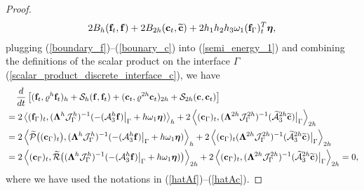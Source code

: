 \begin{proof}
\begin{multline}
2B_{h}({\bf f}_t,{\bf f}) + 2B_{2h}({\bf c}_t,\widetilde{\bf c}) + 2h_1h_2h_3\omega_1({\bf f}_\Gamma)_t^T{\bm \eta},
\end{multline}
plugging (\ref{boundary_f})--(\ref{bounary_c}) into (\ref{semi_energy_1}) and combining the definitions of the scalar product on the interface $\Gamma$ (\ref{scalar_product_discrete_interface_c}), we have
\begin{align*}\label{semi_energy_2}
&\hspace{0.4cm}\frac{d}{dt}\left[({\bf f}_t,\varrho^h {\bf f}_t)_{h} + \mathcal{S}_{h}({\bf f},{\bf f}_t) + ({\bf c}_t,\varrho^{2h} {\bf c}_t)_{2h} + \mathcal{S}_{2h}({\bf c},{\bf c}_t) \right]   \nonumber\\
& = 2\left<({\bf f}_\Gamma)_t,(\bm{\Lambda}^{h}\mathcal{J}^h_\Gamma)^{-1}(-(\mathcal{A}_3^h{\bf f})\big|_\Gamma+h\omega_1{\bm \eta})\right>_{h}+ 2\left<({\bf c}_\Gamma)_t,(\bm{\Lambda}^{2h}\mathcal{J}^{2h}_\Gamma)^{-1}(\wt{\mathcal{A}}_3^{2h}\wt{\bf c})\big|_\Gamma\right>_{2h} \nonumber\\
& = 2\left<\wt{\mathcal{P}}\big(({\bf c}_\Gamma)_t\big),(\bm{\Lambda}^{h}\mathcal{J}^h_\Gamma)^{-1}(-(\mathcal{A}_3^h{\bf f})\big|_\Gamma+h\omega_1{\bm \eta})\right>_{h}+ 2\left<({\bf c}_\Gamma)_t(\bm{\Lambda}^{2h}\mathcal{J}^{2h}_\Gamma)^{-1}(\wt{\mathcal{A}}_3^{2h}\wt{\bf c})\big|_\Gamma\right>_{2h} \nonumber\\
& = 2\left<({\bf c}_\Gamma)_t,\wt{\mathcal{R}}\big((\bm{\Lambda}^{h}\mathcal{J}^h_\Gamma)^{-1}(-(\mathcal{A}_3^h{\bf f})\big|_\Gamma+h\omega_1{\bm \eta})\big)\right>_{2h}+ 2\left<({\bf c}_\Gamma)_t,(\bm{\Lambda}^{2h}\mathcal{J}^{2h}_\Gamma)^{-1}(\wt{\mathcal{A}}_3^{2h}\wt{\bf c})\big|_\Gamma\right>_{2h} = 0,
\end{align*}
where we have used the notations in (\ref{hatAf})--(\ref{hatAc}).
\end{proof}